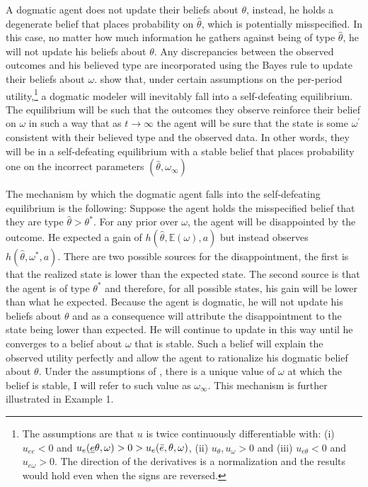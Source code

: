 \documentclass[
  12pt,
]{article}
\begin{document}
A dogmatic agent does not update their beliefs about \(\theta\),
instead, he holds a degenerate belief that places probability on
\(\hat{\theta}\), which is potentially misspecified. In this case, no
matter how much information he gathers against being of type
\(\hat{\theta}\), he will not update his beliefs about \(\theta\). Any
discrepancies between the observed outcomes and his believed type are
incorporated using the Bayes rule to update their beliefs about
\(\omega\). \citet{Heidhues2018} show that, under certain assumptions on
the per-period utility,\footnote{The assumptions are that 
$u$ is twice continuously differentiable with: (i)$u_{ee}<0$ and $u_e(\underline{e} \theta, \omega)>0>u_e(\Bar{e}, \theta, \omega)$, 
(ii) $u_{\theta}, u_{\omega}>0$ and (iii) $u_{e\theta}<0$ and $u_{e\omega}>0$. The direction of the derivatives is a normalization
and the results would hold even when the signs are reversed.} a dogmatic
modeler will inevitably fall into a self-defeating equilibrium. The
equilibrium will be such that the outcomes they observe reinforce their
belief on \(\omega\) in such a way that as \(t\to\infty\) the agent will
be sure that the state is some \(\omega^{'}\) consistent with their
believed type and the observed data. In other words, they will be in a
self-defeating equilibrium with a stable belief that places probability
one on the incorrect parameters \((\hat{\theta}, \omega_{\infty})\)

The mechanism by which the dogmatic agent falls into the self-defeating
equilibrium is the following: Suppose the agent holds the misspecified
belief that they are type \(\hat{\theta}>\theta^*\). For any prior over
\(\omega\), the agent will be disappointed by the outcome. He expected a
gain of \(h(\hat{\theta}, \mathbb{E}(\omega), a)\) but instead observes
\(h(\hat{\theta}, \omega^*, a)\). There are two possible sources for the
disappointment, the first is that the realized state is lower than the
expected state. The second source is that the agent is of type
\(\theta^*\) and therefore, for all possible states, his gain will be
lower than what he expected. Because the agent is dogmatic, he will not
update his beliefs about \(\theta\) and as a consequence will attribute
the disappointment to the state being lower than expected. He will
continue to update in this way until he converges to a belief about
\(\omega\) that is stable. Such a belief will explain the observed
utility perfectly and allow the agent to rationalize his dogmatic belief
about \(\theta\). Under the assumptions of \citet{Heidhues2018}, there
is a unique value of \(\omega\) at which the belief is stable, I will
refer to such value as \(\omega_\infty\). This mechanism is further
illustrated in Example 1.
\end{document}
